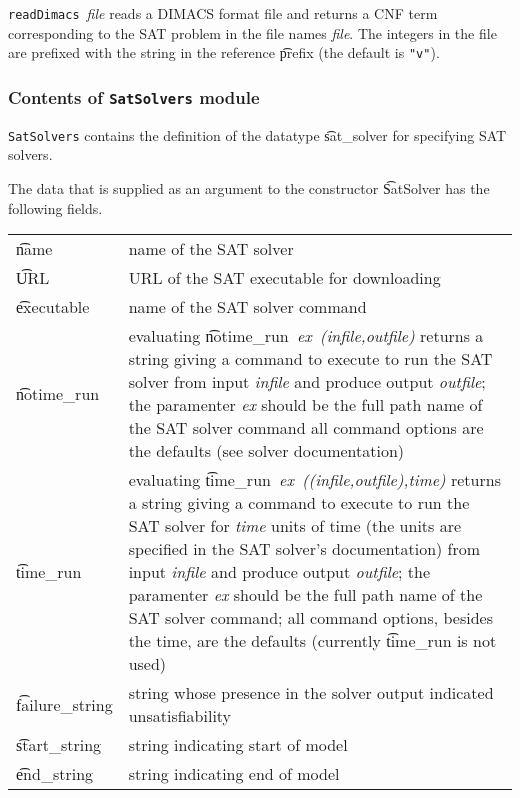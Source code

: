 {\small{\tt readDimacs}~{\it file}} reads a DIMACS format file and returns
a CNF \HOL{} term corresponding to the SAT problem in the file names {\it file}.
The integers in the file are prefixed with the string in the reference 
\t{prefix} (the default is {\small\verb+"v"+}).


\subsubsection{Contents of {\tt SatSolvers} module}
{\tt SatSolvers} contains the definition of the datatype \t{sat\_solver} for specifying SAT solvers.


The data that is supplied as an argument to the constructor \t{SatSolver}
has the following fields.

\medskip

\begin{tabular}{lp{4.75in}}
\t{name} & name of the SAT solver \\

\t{URL} & URL of the SAT executable for downloading\\

\t{executable} &
name of the SAT solver command\\

\t{notime\_run} &
evaluating \t{notime\_run}{\it~ex~(infile,outfile)} returns a string giving a command to execute to run the SAT solver from input {\it infile} and produce output {\it outfile}; the paramenter {\it ex} should be the full path name of the  SAT solver command all command options are the defaults (see solver documentation)\\

\t{time\_run} &
evaluating \t{time\_run}{\it~ex~((infile,outfile),time)} returns a string giving a command to execute to run the SAT solver for {\it time} units of time (the units are specified in the SAT solver's documentation) from input {\it infile} and produce output {\it outfile}; the paramenter {\it ex} should be the full path name of the  SAT solver command; all command options, besides the time, are the defaults (currently \t{time\_run} is not used)\\

\t{failure\_string} & string whose presence in the solver output indicated unsatisfiability\\


\t{start\_string} &
string indicating start of model \\


\t{end\_string} &
string indicating end of model \\

\end{tabular}

